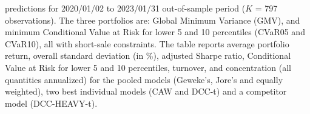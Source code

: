 \begin{table}[ht]
{              predictions for 2020/01/02 to 2023/01/31 out-of-sample period ($K$ = 797 observations).
              The three portfolios are:
             Global Minimum Variance (GMV), and minimum Conditional Value at Risk
             for lower 5 and 10 percentiles (CVaR05 and CVaR10), all with short-sale constraints.
             The table reports average portfolio return,
             overall standard deviation (in \%),
             adjusted Sharpe ratio, Conditional Value at Risk
             for lower 5 and 10 percentiles,
             turnover, and concentration (all quantities annualized) for the
             pooled models (Geweke's, Jore's and
             equally weighted),
              two best individual models (CAW  and DCC-t) and a competitor model (DCC-HEAVY-t).} 
\label{table:gmvfull_FX_new}
\end{table}

